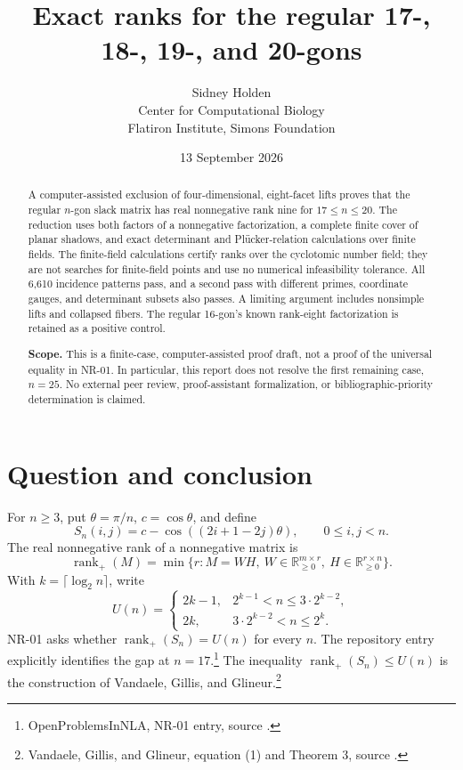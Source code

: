 \documentclass[11pt]{article}
\title{Exact ranks for the regular 17-, 18-, 19-, and 20-gons}
\author{Sidney Holden\\[3pt]\small Center for Computational Biology\\\small Flatiron Institute, Simons Foundation}
\date{13 September 2026}
\theoremstyle{definition}
\newcommand{\rankp}{\operatorname{rank}_{+}}
\newcommand{\R}{\mathbb R}
\begin{document}
\maketitle
\vspace{-1.5em}
\begin{abstract}
A computer-assisted exclusion of four-dimensional, eight-facet lifts proves that the regular $n$-gon slack matrix has real nonnegative rank nine for $17\le n\le20$. The reduction uses both factors of a nonnegative factorization, a complete finite cover of planar shadows, and exact determinant and Pl\"ucker-relation calculations over finite fields. The finite-field calculations certify ranks over the cyclotomic number field; they are not searches for finite-field points and use no numerical infeasibility tolerance. All 6,610 incidence patterns pass, and a second pass with different primes, coordinate gauges, and determinant subsets also passes. A limiting argument includes nonsimple lifts and collapsed fibers. The regular 16-gon's known rank-eight factorization is retained as a positive control.

\textbf{Scope.} This is a finite-case, computer-assisted proof draft, not a proof of the universal equality in NR-01. In particular, this report does not resolve the first remaining case, $n=25$. No external peer review, proof-assistant formalization, or bibliographic-priority determination is claimed.
\end{abstract}

\section{Question and conclusion}
For $n\ge3$, put $\theta=\pi/n$, $c=\cos\theta$, and define
\begin{equation}\label{eq:slack}
 S_n(i,j)=c-\cos((2i+1-2j)\theta),\qquad 0\le i,j<n.
\end{equation}
The real nonnegative rank of a nonnegative matrix is
\[
 \rankp(M)=\min\{r:M=WH,\ W\in\R_{\ge0}^{m\times r},\ H\in\R_{\ge0}^{r\times n}\}.
\]
With $k=\lceil\log_2n\rceil$, write
\begin{equation}\label{eq:upper}
 U(n)=\begin{cases}
 2k-1,&2^{k-1}<n\le3\cdot2^{k-2},\\
 2k,&3\cdot2^{k-2}<n\le2^k.
 \end{cases}
\end{equation}
NR-01 asks whether $\rankp(S_n)=U(n)$ for every $n$. The repository entry explicitly identifies the gap at $n=17$.\footnote{OpenProblemsInNLA, NR-01 entry, source \cite{repo}.} The inequality $\rankp(S_n)\le U(n)$ is the construction of Vandaele, Gillis, and Glineur.\footnote{Vandaele, Gillis, and Glineur, equation (1) and Theorem 3, source \cite{vgg}.}
\end{document}
